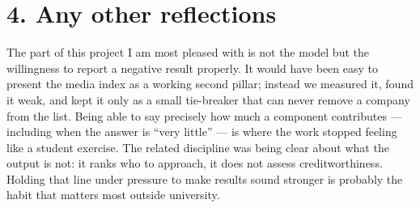 \documentclass[11pt, a4paper]{article}
\begin{document}
\section*{4. Any other reflections}

The part of this project I am most pleased with is not the model but the willingness to report
a negative result properly. It would have been easy to present the media index as a working
second pillar; instead we measured it, found it weak, and kept it only as a small tie-breaker
that can never remove a company from the list. Being able to say precisely how much a
component contributes --- including when the answer is ``very little'' --- is where the work
stopped feeling like a student exercise. The related discipline was being clear about what the
output is not: it ranks who to approach, it does not assess creditworthiness. Holding that
line under pressure to make results sound stronger is probably the habit that matters most
outside university.
\end{document}
